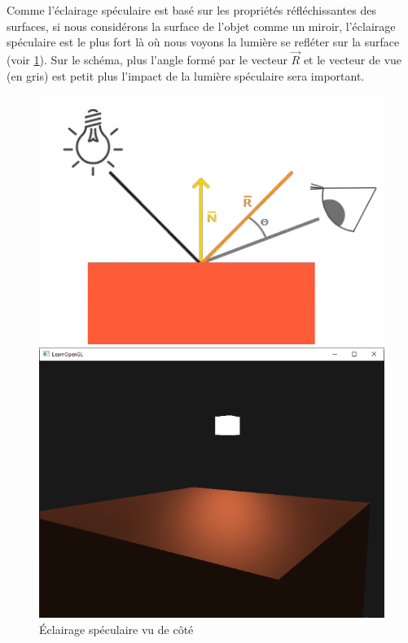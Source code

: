 Comme l'éclairage spéculaire est basé sur les propriétés réfléchissantes des surfaces, si nous considérons la surface de l'objet comme un miroir, l'éclairage spéculaire est le plus fort là où nous voyons la lumière se refléter sur la surface (voir \ref{specular00}). Sur le schéma, plus l'angle formé par le vecteur $\vec{R}$ et le vecteur de vue (en gris) est petit plus l'impact de la lumière spéculaire sera important. 


\begin{figure}[h]
  \begin{minipage}[b]{0.45\linewidth}
    \centering
    \includegraphics[width=\linewidth]{images/shaders/specular00.png}
    \caption{Éclairage spéculaire vu de côté}
    \label{specular00}
  \end{minipage}
  \hspace{0.1\linewidth} %
  \begin{minipage}[b]{0.45\linewidth}
    \centering
    \includegraphics[width=\linewidth]{images/shaders/specular01.png}

\end{minipage}
\end{figure}
